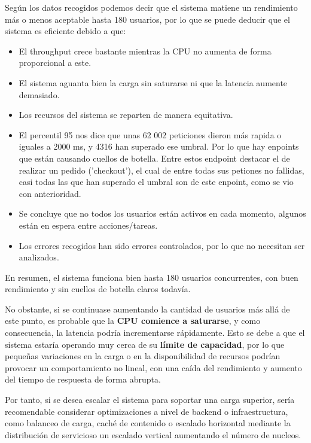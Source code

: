\documentclass[10pt]{book}
\begin{document}
Según los datos recogidos podemos decir que el sistema matiene un rendimiento más o menos aceptable hasta 180 usuarios, por lo que se puede deducir que el sistema es eficiente debido a que:

\begin{itemize}
    \item El throughput crece bastante mientras la CPU no aumenta de forma proporcional a este.
    \item El sistema aguanta bien la carga sin saturarse ni que la latencia aumente demasiado.
    \item Los recursos del sistema se reparten de manera equitativa.
    \item El percentil 95 nos dice que unas 62 002 peticiones dieron más rapida o iguales a 2000 ms, y 4316 han superado ese umbral. Por lo que hay enpoints que están causando cuellos de botella. Entre estos endpoint destacar el de realizar un pedido ('checkout'), el cual de entre todas sus petiones no fallidas, casi todas las que han superado el umbral son de este enpoint, como se vio con anterioridad.
    \item Se concluye que no todos los usuarios están activos en cada momento, algunos están en espera entre acciones/tareas.
    \item Los errores recogidos han sido errores controlados, por lo que no necesitan ser analizados.
\end{itemize}

En resumen, el sistema funciona bien hasta 180 usuarios concurrentes, con buen rendimiento y sin cuellos de botella claros todavía.

No obstante, si se continuase aumentando la cantidad de usuarios más allá de este punto, es probable que la \textbf{CPU comience a saturarse}, y como consecuencia, la latencia podría incrementarse rápidamente. Esto se debe a que el sistema estaría operando muy cerca de su \textbf{límite de capacidad}, por lo que pequeñas variaciones en la carga o en la disponibilidad de recursos podrían provocar un comportamiento no lineal, con una caída del rendimiento y aumento del tiempo de respuesta de forma abrupta.

Por tanto, si se desea escalar el sistema para soportar una carga superior, sería recomendable considerar optimizaciones a nivel de backend o infraestructura, como balanceo de carga, caché de contenido o escalado horizontal mediante la distribución de servicioso un escalado vertical aumentando el número de nucleos.
\end{document}
